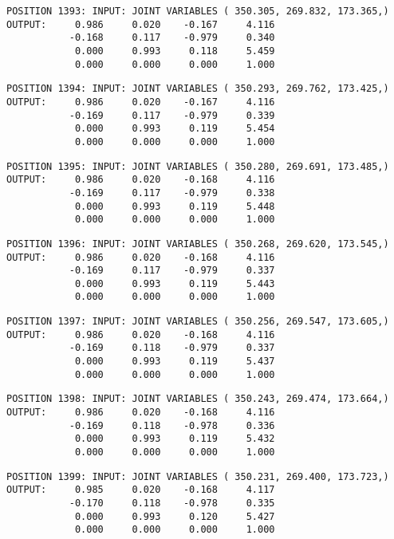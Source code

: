 \begin{verbatim}
POSITION 1393: INPUT: JOINT VARIABLES ( 350.305, 269.832, 173.365,)
OUTPUT:     0.986     0.020    -0.167     4.116
           -0.168     0.117    -0.979     0.340
            0.000     0.993     0.118     5.459
            0.000     0.000     0.000     1.000
\end{verbatim} \pagebreak[1]\begin{verbatim}
POSITION 1394: INPUT: JOINT VARIABLES ( 350.293, 269.762, 173.425,)
OUTPUT:     0.986     0.020    -0.167     4.116
           -0.169     0.117    -0.979     0.339
            0.000     0.993     0.119     5.454
            0.000     0.000     0.000     1.000
\end{verbatim} \pagebreak[1]\begin{verbatim}
POSITION 1395: INPUT: JOINT VARIABLES ( 350.280, 269.691, 173.485,)
OUTPUT:     0.986     0.020    -0.168     4.116
           -0.169     0.117    -0.979     0.338
            0.000     0.993     0.119     5.448
            0.000     0.000     0.000     1.000
\end{verbatim} \pagebreak[1]\begin{verbatim}
POSITION 1396: INPUT: JOINT VARIABLES ( 350.268, 269.620, 173.545,)
OUTPUT:     0.986     0.020    -0.168     4.116
           -0.169     0.117    -0.979     0.337
            0.000     0.993     0.119     5.443
            0.000     0.000     0.000     1.000
\end{verbatim} \pagebreak[1]\begin{verbatim}
POSITION 1397: INPUT: JOINT VARIABLES ( 350.256, 269.547, 173.605,)
OUTPUT:     0.986     0.020    -0.168     4.116
           -0.169     0.118    -0.979     0.337
            0.000     0.993     0.119     5.437
            0.000     0.000     0.000     1.000
\end{verbatim} \pagebreak[1]\begin{verbatim}
POSITION 1398: INPUT: JOINT VARIABLES ( 350.243, 269.474, 173.664,)
OUTPUT:     0.986     0.020    -0.168     4.116
           -0.169     0.118    -0.978     0.336
            0.000     0.993     0.119     5.432
            0.000     0.000     0.000     1.000
\end{verbatim} \pagebreak[1]\begin{verbatim}
POSITION 1399: INPUT: JOINT VARIABLES ( 350.231, 269.400, 173.723,)
OUTPUT:     0.985     0.020    -0.168     4.117
           -0.170     0.118    -0.978     0.335
            0.000     0.993     0.120     5.427
            0.000     0.000     0.000     1.000
\end{verbatim} \pagebreak[1]\begin{verbatim}

\end{verbatim}
